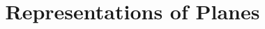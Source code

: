 \documentclass{ximera}
\title{Representations of Planes}
\begin{document}
  
\begin{abstract}  
\end{abstract}  
\maketitle 
\end{document}
